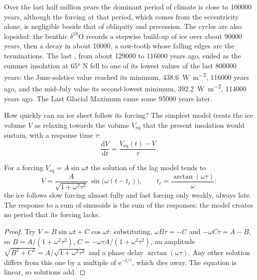 Over the last half million years the dominant period of climate is close to \num{100000} years,
although the forcing at that period, which comes from the eccentricity alone, is negligible
beside that of obliquity and precession. The cycles are also lopsided: the benthic $\delta^{18}$O
records a stepwise build-up of ice over about \num{90000} years, then a decay in about
\num{10000}, a saw-tooth whose falling edges are the terminations. The last , from
about \num{129000} to \num{116000} years ago, ended as the summer insolation at \ang{65} N fell
to one of its lowest values of the last \num{800000} years: the June-solstice value reached its
minimum, \qty{438.6}{W.m^{-2}}, \num{116000} years ago, and the mid-July value its second-lowest
minimum, \qty{392.2}{W.m^{-2}}, \num{114000} years ago. The Last Glacial Maximum came some
\num{95000} years later.

How quickly can an ice sheet follow its forcing? The simplest model treats the ice volume $V$ as
relaxing towards the volume $V_{\mathrm{eq}}$ that the present insolation would sustain, with a
response time $\tau$:
\[
  \frac{\mathrm dV}{\mathrm dt} = \frac{V_{\mathrm{eq}}(t) - V}{\tau} .
\]

\begin{proposition}\label{prop:b2:orbital-forcing:lag}
For a forcing $V_{\mathrm{eq}} = A\sin\omega t$ the solution of the lag model tends to
\[
  V = \frac{A}{\sqrt{1 + \omega^2\tau^2}}\,\sin\bigl(\omega(t - t_{\ell})\bigr),\qquad
  t_{\ell} = \frac{\arctan(\omega\tau)}{\omega} :
\]
the ice follows slow forcing almost fully and fast forcing only weakly, always late. The response
to a sum of sinusoids is the sum of the responses: the model creates no period that its forcing
lacks.
\end{proposition}

\begin{proof}
Try $V = B\sin\omega t + C\cos\omega t$: substituting, $\omega B\tau = -C$ and $-\omega C\tau = A -
B$, so $B = A/(1 + \omega^2\tau^2)$, $C = -\omega\tau A/(1 + \omega^2\tau^2)$, an amplitude
$\sqrt{B^2 + C^2} = A/\sqrt{1 + \omega^2\tau^2}$ and a phase delay $\arctan(\omega\tau)$. Any other
solution differs from this one by a multiple of $\mathrm e^{-t/\tau}$, which dies away. The
equation is linear, so solutions add.
\end{proof}

